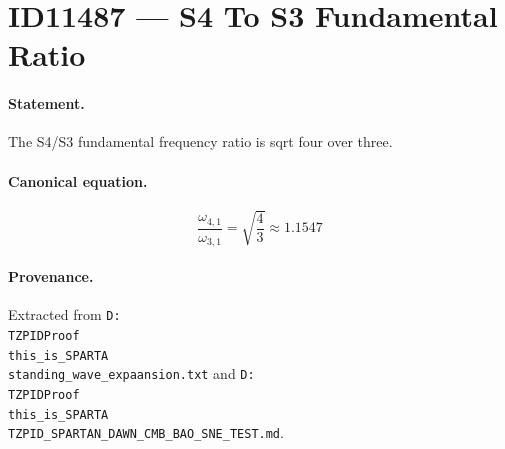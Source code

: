 \section*{ID11487 --- S4 To S3 Fundamental Ratio}

\paragraph{Statement.}
The S4/S3 fundamental frequency ratio is sqrt four over three.

\paragraph{Canonical equation.}
\[
\frac{\omega_{4,1}}{\omega_{3,1}}=\sqrt{\frac{4}{3}}\approx1.1547
\]

\paragraph{Provenance.}
Extracted from \texttt{D:\\TZPIDProof\\this\_is\_SPARTA\\standing\_wave\_expaansion.txt} and \texttt{D:\\TZPIDProof\\this\_is\_SPARTA\\TZPID\_SPARTAN\_DAWN\_CMB\_BAO\_SNE\_TEST.md}.
